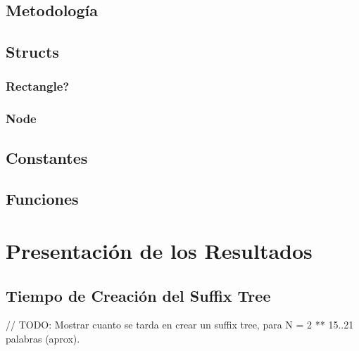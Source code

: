 \documentclass[letterpaper,10pt]{article}
\begin{document}
	\subsection{Metodología}

	\subsection{Structs}

	\subsubsection{Rectangle?}

	\subsubsection{Node}

	\subsection{Constantes}

	\subsection{Funciones}

	\newpage

	\section{Presentación de los Resultados}

	\subsection{Tiempo de Creación del Suffix Tree}

	// TODO: Mostrar cuanto se tarda en crear un suffix tree, para N = 2 ** 15..21 palabras (aprox).

	\newpage
\end{document}
